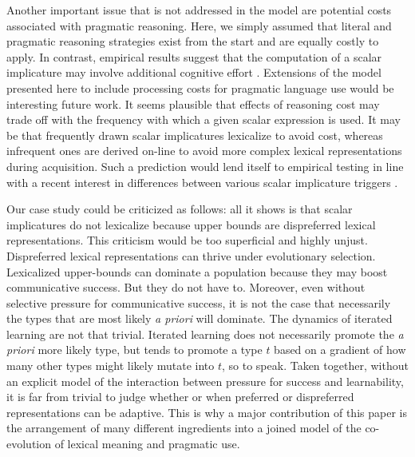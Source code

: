 \documentclass[a4paper, 11pt]{article}
\theoremstyle{Satz}
\begin{document}
Another important issue that is not addressed in the model are potential costs associated with
pragmatic reasoning. Here, we simply assumed that literal and pragmatic reasoning strategies
exist from the start and are equally costly to apply. In contrast, empirical results suggest
that the computation of a scalar implicature may involve additional cognitive effort
\citep[e.g.][]{BrehenyKatsos2006:Are-Generalised,deNeys+schaeken:2007,huang+snedeker:2009,Jr.Bailey2013:Possibly-all-of}. Extensions
of the model presented here to include processing costs for pragmatic language use would be
interesting future work. It seems plausible that effects of reasoning cost may trade off with
the frequency with which a given scalar expression is used. It may be that frequently drawn
scalar implicatures lexicalize to avoid cost, whereas infrequent ones are derived on-line to
avoid more complex lexical representations during acquisition. Such a prediction would lend itself to
empirical testing in line with a recent interest in differences between various scalar
implicature triggers \citep{Tielvan-TielMiltenburgvan-Miltenburg2014:Scalar-Diversit}.


Our case study could be criticized as follows: all it shows is that scalar implicatures do not
lexicalize because upper bounds are dispreferred lexical representations. This criticism would be too
superficial and highly unjust. Dispreferred lexical representations can thrive under evolutionary
selection. Lexicalized upper-bounds can dominate a population because they may boost
communicative success. But they do not have to. Moreover, even without selective pressure
for communicative success, it is not the case that necessarily the types that are most
likely \emph{a priori} will dominate. The dynamics of iterated learning are not that
trivial. Iterated learning does not necessarily promote the \emph{a priori} more likely type,
but tends to promote a type $t$ based on a gradient of how many other types might likely mutate
into $t$, so to speak. Taken together, without an explicit model of the interaction between
pressure for success and learnability, it is far from trivial to judge whether or when
preferred or dispreferred representations can be adaptive. This is why a major contribution of this
paper is the arrangement of many different ingredients into a joined model of the co-evolution
of lexical meaning and pragmatic use. 
\end{document}
